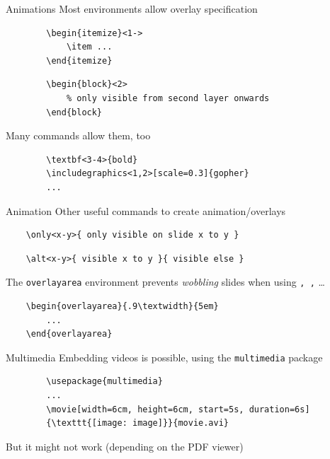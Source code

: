 \documentclass[xcolor=x11names, xcolor=table]{beamer}
\begin{document}
\begin{frame}[fragile]{Animations}
    Most environments allow overlay specification
    \begin{verbatim}
        \begin{itemize}<1->
            \item ...
        \end{itemize}
    \end{verbatim}

    \begin{verbatim}
        \begin{block}<2>
            % only visible from second layer onwards
        \end{block}
    \end{verbatim}

    Many commands allow them, too

    \begin{verbatim}
        \textbf<3-4>{bold}
        \includegraphics<1,2>[scale=0.3]{gopher}
        ...
    \end{verbatim}
\end{frame}


\begin{frame}[fragile]{Animation}
Other useful commands to create animation/overlays

\begin{verbatim}
    \only<x-y>{ only visible on slide x to y }
\end{verbatim}
\begin{verbatim}
    \alt<x-y>{ visible x to y }{ visible else }
\end{verbatim}


The \texttt{overlayarea} environment prevents \emph{wobbling} slides when using
\texttt{\only, \alt,} \dots

\begin{verbatim}
    \begin{overlayarea}{.9\textwidth}{5em}
        ...
    \end{overlayarea}
\end{verbatim}
\end{frame}


\begin{frame}[fragile]{Multimedia}
    Embedding videos is possible, using the \texttt{multimedia} package

    \vspace{1em}
    \begin{verbatim}
        \usepackage{multimedia}
        ...
        \movie[width=6cm, height=6cm, start=5s, duration=6s]
        {\texttt{[image: image]}}{movie.avi}
    \end{verbatim}

    \vspace{1em}
    But it might not work (depending on the PDF viewer)
\end{frame}
\end{document}
